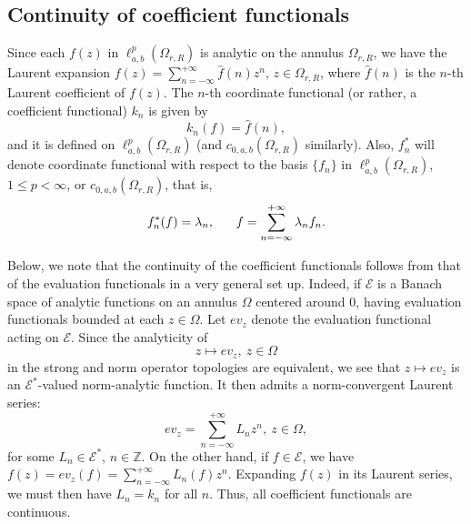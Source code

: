 \documentclass[12pt, reqno]{amsart}
\newtheorem{proposition}[theorem]{Proposition}
\theoremstyle{definition}
\theoremstyle{remark}
\numberwithin{equation}{section}
\begin{document}
 
\subsection{Continuity of coefficient functionals} Since each $f(z)$ in $\ell^p_{a,b}(\Omega_{r,R})$ is analytic on the annulus $\Omega_{r,R}$, we have the Laurent expansion $f(z)=\sum_{n=-\infty}^{+\infty} \widehat{f}(n)z^n$, $z\in \Omega_{r,R}$, where $\widehat{f}(n)$ is the $n$-th Laurent coefficient of $f(z)$. The $n$-th coordinate functional (or rather, a coefficient functional)  $k_n$ is given by 
\[
k_n(f)=\widehat{f}(n),
\]
and it is defined on $\ell^p_{a,b}(\Omega_{r,R})$ (and $c_{0,a,b}(\Omega_{r,R})$ similarly). Also, $f_n^*$ will denote coordinate functional with respect to the basis $\{f_n\}$ in $\ell^p_{a,b}(\Omega_{r,R})$, $1\leq p<\infty$, or $c_{0,a,b}(\Omega_{r,R})$, that is,
\[
f_n^*(f)=\lambda_n,\hskip .6cm f=\sum_{n=-\infty}^{+\infty}\lambda_n f_n.
\]

Below, we note that the continuity of the coefficient functionals follows from that of the evaluation functionals in a very general set up. Indeed, if $\mathcal{E}$ is a Banach space of analytic functions on an annulus $\Omega$ centered around $0$, having evaluation functionals bounded at each $z\in \Omega$. Let $ev_z$ denote the evaluation functional acting on $\mathcal{E}$. Since the  analyticity of 
    \[
    z\mapsto ev_z, ~z\in \Omega
    \]
    in the strong and norm operator topologies are equivalent, we see that $z\mapsto ev_z$ is an $\mathcal{E}^*$-valued norm-analytic function. It then admits a norm-convergent Laurent series:  
    \[
    ev_z=\sum_{n=-\infty}^{+\infty} L_n z^n,~ z\in \Omega,
    \]
    for some $L_n\in \mathcal{E}^*$, $n\in \mathbb{Z}$. On the other hand, if $f\in \mathcal{E}$, we have $f(z)=ev_z(f)=\sum_{n=-\infty}^{+\infty} L_n(f)z^n.$ Expanding $f(z)$ in its Laurent series, we must then have $L_n=k_n$ for all $n$. Thus, all coefficient functionals are continuous.

\end{document}
